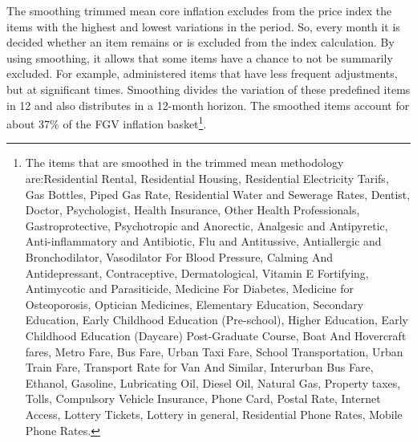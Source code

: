\documentclass[10pt]{article}
\begin{document}
The smoothing trimmed mean core inflation excludes from the price index the items with the highest and lowest variations in the period. So, every month it is decided whether an item remains or is excluded from the index calculation. By using smoothing, it allows that some items have a chance to not be summarily excluded. For example, administered items that have less frequent adjustments, but at significant times. Smoothing divides the variation of these predefined items in 12 and also distributes in a 12-month horizon.  The smoothed items account for about 37\% of the FGV inflation basket\footnote{The items that are smoothed in the trimmed mean methodology are:Residential Rental, Residential Housing,  Residential Electricity Tarifs, Gas Bottles, Piped Gas Rate, Residential Water and Sewerage Rates, Dentist, Doctor, Psychologist, Health Insurance, Other Health Professionals, Gastroprotective, Psychotropic and Anorectic, Analgesic and Antipyretic, Anti-inflammatory and Antibiotic, Flu and Antitussive, Antiallergic and Bronchodilator, Vasodilator For Blood Pressure, Calming And Antidepressant, Contraceptive, Dermatological, Vitamin E Fortifying, Antimycotic and Parasiticide, Medicine For Diabetes, Medicine for Osteoporosis, Optician Medicines, Elementary Education, Secondary Education, Early Childhood Education (Pre-school), Higher Education, Early Childhood Education (Daycare)  Post-Graduate Course, Boat  And Hovercraft fares, Metro Fare, Bus Fare, Urban Taxi Fare, School Transportation, Urban Train Fare, Transport Rate for Van And Similar,  Interurban Bus Fare, Ethanol, Gasoline, Lubricating Oil, Diesel Oil, Natural Gas, Property taxes, Tolls, Compulsory Vehicle Insurance, Phone Card, Postal Rate, Internet Access, Lottery Tickets, Lottery in general, Residential Phone Rates, Mobile Phone Rates.}.
\end{document}
